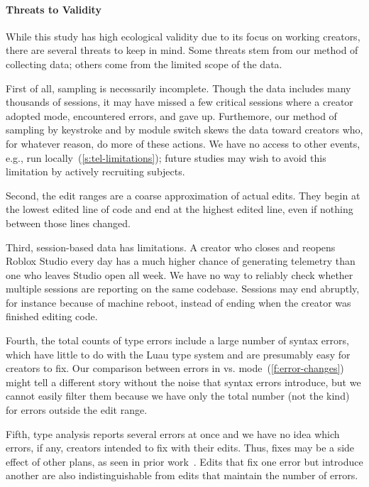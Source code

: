 \documentclass[english,submission,cleveref]{programming}
\begin{document}
\paragraph{Threats to Validity}
\label{s:threats}

While this study has high ecological validity due to its focus on
working creators, there are several threats to keep in mind.
Some threats stem from our method of collecting data; others
come from the limited scope of the data.

First of all, sampling is necessarily incomplete.
Though the data includes many thousands of sessions, it
may have missed a few critical sessions where a creator
adopted \mstrict{} mode, encountered  errors,
and gave up.
Furthemore, our method of sampling by keystroke and by module switch
skews the data toward creators who, for whatever reason, do more
of these actions.
We have no access to other events, e.g., run locally~(\cref{s:tel-limitations});
future studies may wish to avoid this limitation by actively
recruiting subjects.

Second, the edit ranges are a coarse approximation of actual edits.
They begin at the lowest edited line of code and end at the highest
edited line, even if nothing between those lines changed.

Third, session-based data has limitations.
A creator who closes and reopens Roblox Studio every day has
a much higher chance of generating telemetry than one who
leaves Studio open all week.
We have no way to reliably check whether multiple sessions are
reporting on the same codebase.
Sessions may end abruptly, for instance because of machine reboot,
instead of ending when the creator was finished editing code.

Fourth, the total counts of type errors include a large number of syntax errors,
which have little to do with the Luau type system and are presumably easy for
creators to fix.
Our comparison between \FS{} errors in \mnocheck{} vs.
\mstrict{} mode~(\cref{f:error-changes}) might tell a different story
without the noise that syntax errors introduce, but we cannot easily
filter them because we have only the total number (not the kind)
for errors outside the edit range.

Fifth, type analysis reports several errors at once and we have no idea which
errors, if any, creators intended to fix with their edits.
Thus, fixes may be a side effect of other plans, as seen in prior work~\cite{mfk-sigcse-2011}.
Edits that fix one error but introduce another are also indistinguishable
from edits that maintain the number of errors.
\end{document}
